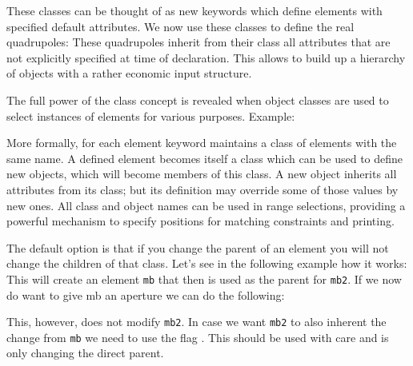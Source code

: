 These classes can be thought of as new keywords which define elements
with specified default attributes. We now use these classes to define
the real quadrupoles:  
These quadrupoles inherit from their class all attributes that are not
explicitly specified at time of declaration. 
This allows to build up a hierarchy of objects with a rather
economic input structure.  

The full power of the class concept is revealed when object classes are
used to select instances of elements for various purposes. Example:  



More formally, for each element keyword \madx maintains a class of
elements with the same name. A defined element becomes itself a class
which can be used to define new objects, which will become members of
this class. A new object inherits all attributes from its class; but its
definition may override some of those values by new ones. All class and
object names can be used in range selections, providing a powerful
mechanism to specify positions for matching constraints and printing.

The default option is that if you change the parent of an element you will
not change the children of that class. Let's see in the following example how 
it works:
 This will create an element \texttt{mb} that then is used as the parent for \texttt{mb2}. If we now do want to give mb
 an aperture we can do the following:

 This, however, does not modify \texttt{mb2}. In case we want \texttt{mb2} to also inherent the change from \texttt{mb} we need to use the
 flag . This should be used with care and is only changing the direct parent.

